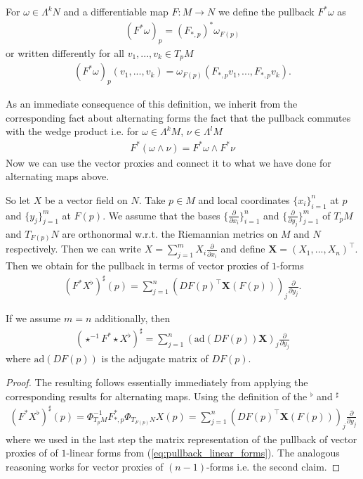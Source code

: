 \documentclass[../main.tex]{subfiles}
\begin{document}
\begin{definition}
    For $\omega \in \Lambda^k N$ and a differentiable map $F:M \rightarrow N$ 
    we define the pullback $F^*\omega$ as
    \begin{align*}
        (F^*\omega)_p = (F_{*,p})^* \omega_{F(p)}
    \end{align*}
    or written differently for all $v_1,...,v_k \in T_p M$
    \begin{align*}
        (F^*\omega)_p (v_1,...,v_k) = \omega_{F(p)}(F_{*,p} v_1, ..., F_{*,p} v_k).
    \end{align*}
\end{definition}
As an immediate consequence of this definition, we inherit from the corresponding fact about alternating forms
the fact that 
the pullback commutes with the wedge product i.e. for $\omega \in \Lambda^k M$, 
$\nu \in \Lambda^{l} M$
\begin{align*}
    F^*(\omega \wedge \nu ) = F^* \omega \wedge F^* \nu
\end{align*}
Now we can use the vector proxies and connect it to what we have done 
for alternating maps above. 
\begin{proposition}\label{prop:pullback_vector_fields}
    So let $X$ be a vector field on $N$. Take $p \in M$ and local coordinates
    $\{x_i\}_{i=1}^n$ at $p$ and $\{y_j\}_{j=1}^m$ at $F(p)$. We assume that the bases
    $\{ \frac{\partial}{\partial x_i} \}_{i=1}^n$ and 
    $\{ \frac{\partial}{\partial y_j} \}_{j=1}^m$ of $T_p M$ and $T_{F(p)} N$ 
    are orthonormal w.r.t. the Riemannian metrics
    on $M$ and $N$ respectively. 
    Then we can write $X = \sum_{j=1}^m X_i \frac{\partial}{\partial x_i}$
    and define $\mathbf{X} = (X_1,..., X_n)^\top$.
    Then we obtain for the pullback in terms of
    vector proxies of $1$-forms
    \begin{align*}
        (F^* X^\flat)^\sharp(p)
        = \sum_{j=1}^n (DF(p)^\top \mathbf{X}(F(p)))_j \frac{\partial}{\partial y_j}.
    \end{align*}

    If we assume $m=n$ additionally, then 
    \begin{align*}
        (\star^{-1} F^* \star X^\flat)^\sharp 
        = \sum_{j=1}^n (\text{ad}(DF(p)) \mathbf{X})_j \frac{\partial}{\partial y_j}
    \end{align*}
    where $\text{ad}(DF(p))$ is the adjugate matrix of $DF(p)$.
\end{proposition}
\begin{proof}
    The resulting follows essentially immediately from applying the 
    corresponding results for alternating maps. Using the definition of 
    the $^\flat$ and $^\sharp$
    \begin{align*}
        (F^* X^\flat)^\sharp(p)
        = \Phi^{-1}_{T_p M} F_{*,p}^* \Phi_{T_{F(p)}N} X(p)
        = \sum_{j=1}^n (DF(p)^\top \mathbf{X}(F(p)))_j \frac{\partial}{\partial y_j}
    \end{align*}
    where we used in the last step the matrix representation of the pullback of vector proxies of
    of $1$-linear forms from (\ref{eq:pullback_linear_forms}). The analogous reasoning works 
    for vector proxies of $(n-1)$-forms i.e. the second claim.
\end{proof}
\end{document}
